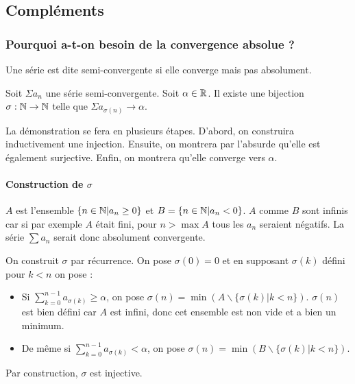 \subsection{Compléments}
\subsubsection{Pourquoi a-t-on besoin de la convergence absolue ?}
\begin{defini}
    Une série est dite semi-convergente si elle converge mais pas absolument.
\end{defini}
\begin{theoreme}
    Soit $\Sigma a_n$ une série semi-convergente. Soit $\alpha \in \mathbb{R}$. Il existe une bijection $\sigma : \mathbb{N} \to \mathbb{N}$ telle que $\Sigma a_{\sigma(n)}  \to \alpha$.
\end{theoreme}

La démonstration se fera en plusieurs étapes. D'abord, on construira inductivement une injection. Ensuite, on montrera par l'absurde qu'elle est également surjective. Enfin, on montrera qu'elle converge vers $\alpha$.

\paragraph{Construction de $\sigma$} $A$ est l'ensemble $\{ n \in \mathbb{N} | a_n \geq 0 \}$ et $B= \{ n\in \mathbb{N} | a_n <0\}$. $A$ comme $B$ sont infinis car si par exemple $A$ était fini, pour $n > \max A$ tous les $a_n$ seraient négatifs. La série $\sum a_n$ serait donc absolument convergente.

On construit $\sigma$ par récurrence. On pose $\sigma(0)=0$ et en supposant $\sigma(k)$ défini pour $k<n$ on pose :
\begin{itemize}
    \item Si $\displaystyle\sum_{k=0}^{n-1}a_{\sigma(k)} \geq \alpha$, on pose $\sigma(n)=\min(A\backslash\{\sigma(k)|k<n\})$. $\sigma(n)$ est bien défini car $A$ est infini, donc cet ensemble est non vide et a bien un minimum.
    \item De même si $\displaystyle\sum_{k=0}^{n-1}a_{\sigma(k)} < \alpha$, on pose $\sigma(n)=\min(B\backslash\{\sigma(k)|k<n\})$.
\end{itemize}
Par construction, $\sigma$ est injective.

